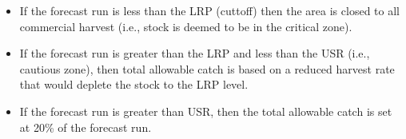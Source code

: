 \begin{itemize}
	\item If the forecast run is less than the LRP (cuttoff) then the area is closed to all commercial harvest  (i.e., stock is deemed to be in the critical zone).
	
	\item If the forecast run is greater than the LRP and less than the USR (i.e., cautious zone), then total allowable catch is based on a reduced harvest rate that would deplete the stock to the LRP level.
	
	\item If the forecast run is greater than USR, then the total allowable catch is set at 20\% of the forecast run.
\end{itemize}



	
